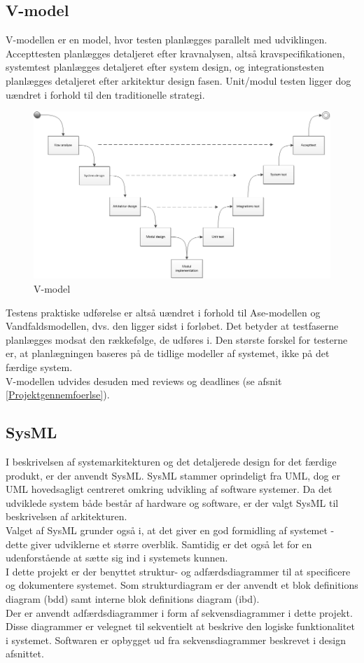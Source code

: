 \subsection{V-model}
V-modellen er en model, hvor testen planlægges parallelt med udviklingen. Accepttesten planlægges detaljeret efter kravnalysen, altså kravspecifikationen, systemtest planlægges detaljeret efter system design, og integrationstesten planlægges detaljeret efter arkitektur design fasen. Unit/modul testen ligger dog uændret i forhold til den traditionelle strategi.
\begin{figure}[H]
	\centering
	\includegraphics[width=1\textwidth]{Figurer/Metode/Vmodel}
	\caption{V-model}
	\label{Vmodel}
\end{figure}
Testens praktiske udførelse er altså uændret i forhold til Ase-modellen og Vandfaldsmodellen, dvs. den ligger sidst i forløbet. Det betyder at testfaserne planlægges modsat den rækkefølge, de udføres i. Den største forskel for testerne er, at planlægningen baseres på de tidlige modeller af systemet, ikke på det færdige system. \\
 V-modellen udvides desuden med reviews og deadlines (se afsnit \ref{Projektgennemfoerlse}).

\subsection{SysML}
 I beskrivelsen af systemarkitekturen og det detaljerede design for det færdige produkt, er der anvendt SysML. SysML stammer oprindeligt fra UML, dog er UML hovedsagligt centreret omkring udvikling af software systemer. Da det udviklede system både består af hardware og software, er der valgt SysML til beskrivelsen af arkitekturen.\\
Valget af SysML grunder også i, at det giver en god formidling af systemet - dette giver udviklerne et større overblik. Samtidig er det også let for en udenforstående at sætte sig ind i systemets kunnen.\\
I dette projekt er der benyttet struktur- og adfærdsdiagrammer til at specificere og dokumentere systemet. Som strukturdiagram er der anvendt et blok definitions diagram (bdd) samt interne blok definitions diagram (ibd).\\
Der er anvendt adfærdsdiagrammer i form af sekvensdiagrammer i dette projekt. Disse diagrammer er velegnet til sekventielt at beskrive den logiske funktionalitet i systemet. Softwaren er opbygget ud fra sekvensdiagrammer beskrevet i design afsnittet.

